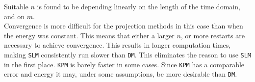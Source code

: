 \noindent Suitable $n$ is found to be depending linearly on the length of the time domain, and on $m$.\\

\noindent Convergence is more difficult for the projection methods in this case than when the energy was constant. This means that either a larger $n$, or more restarts are necessary to achieve convergence. This results in longer computation times,
making \texttt{SLM} consistently run slower than \texttt{DM}. This eliminates the reason to use \texttt{SLM} in the first place. \texttt{KPM} is barely faster in some cases. Since \texttt{KPM} has a comparable error and energy it may, under some assumptions, be more desirable than \texttt{DM}.
